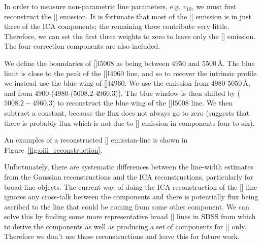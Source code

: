 In order to measure non-parametric line parameters, e.g. $v_{10}$, we must first reconstruct the [] emission. 
It is fortunate that most of the [] emission is in just three of the ICA components; the remaining three contribute very little. 
Therefore, we can set the first three weights to zero to leave only the [] emission. 
The four correction components are also included. 

We define the boundaries of []\l$5008$ as being between $4950$ and $5500$\,\AA. 
The blue limit is close to the peak of the []\l$4960$ line, and so to recover the intrinsic profile we instead use the blue wing of []\l$4960$. 
We use the emission from $4980$-$5050$\,\AA, and from $4900$-($4980$-($5008.2$-$4960.3$)). 
The blue window is then shifted by ($5008.2-4960.3$) to reconstruct the blue wing of the []\l$5008$ line. 
We then subtract a constant, because the flux does not always go to zero (suggests that there is probably flux which is not due to [] emission in components four to six). 

An examples of a reconstructed [] emission-line is shown in Figure~\ref{fig:oiii_reconstruction}. 

Unfortunately, there are systematic differences between the line-width estimates from the Gaussian reconstructions and the ICA reconstructions, particularly for broad-line objects.
The current way of doing the ICA reconstruction of the [] line ignores any cross-talk between the components and there is potentially flux being ascribed to the line that could be coming from some other component. 
We can solve this by finding some more representative broad [] lines in SDSS from which to derive the components as well as producing a set of components for [] only.
Therefore we don't use these reconstructions and leave this for future work. 

